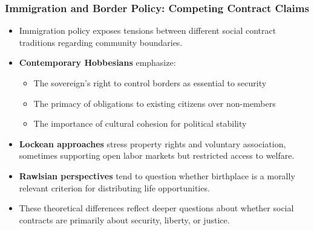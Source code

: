 \documentclass[aspectratio=169]{beamer}
\begin{document}
\begin{frame}
  \frametitle{Immigration and Border Policy: Competing Contract Claims}
  
  \begin{itemize}
    \item Immigration policy exposes tensions between different social contract traditions regarding community boundaries.
    \item \textbf{Contemporary Hobbesians} emphasize:
      \begin{itemize}
        \item The sovereign's right to control borders as essential to security
        \item The primacy of obligations to existing citizens over non-members
        \item The importance of cultural cohesion for political stability
      \end{itemize}
    \item \textbf{Lockean approaches} stress property rights and voluntary association, sometimes supporting open labor markets but restricted access to welfare.
    \item \textbf{Rawlsian perspectives} tend to question whether birthplace is a morally relevant criterion for distributing life opportunities.
    \item These theoretical differences reflect deeper questions about whether social contracts are primarily about security, liberty, or justice.
  \end{itemize}
\end{frame}
\end{document}
